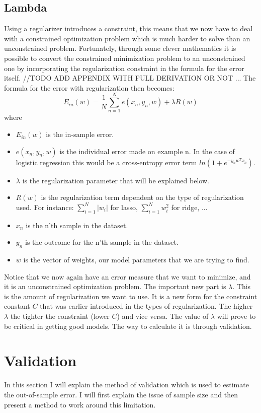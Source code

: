 \subsection{Lambda}
Using a regularizer introduces a constraint, this means that we now have to deal with a constrained optimization problem which is much harder to solve than an unconstrained problem. Fortunately, through some clever mathematics it is possible to convert the constrained minimization problem to an unconstrained one by incorporating the regularization constraint in the formula for the error itself. //TODO ADD APPENDIX WITH FULL DERIVATION OR NOT ... The formula for the error with regularization then becomes:
$$
E_{in}(w) = \frac{1}{N}\sum_{n=1}^{N}e(x_{n},y_{n},w)+\lambda R(w)
$$
where
\begin{itemize}
	\item $E_{in}(w)$ is the in-sample error.
	\item $e(x_{n},y_{n},w)$ is the individual error made on example n. In the case of logistic regression this would be a cross-entropy error term $ln(1+e^{-y_{n}w^{T}x_{n}})$.
	\item $\lambda$ is the regularization parameter that will be explained below.
	\item $R(w)$ is the regularization term dependent on the type of regularization used. For instance: $\sum_{i=1}^{N}\lvert w_{i}\rvert$ for lasso, $\sum_{i=1}^{N}w_{i}^{2}$ for ridge, ...
	\item $x_{n}$ is the n'th sample in the dataset.
	\item $y_{n}$ is the outcome for the n'th sample in the dataset.
	\item $w$ is the vector of weights, our model parameters that we are trying to find.
\end{itemize}
Notice that we now again have an error measure that we want to minimize, and it is an unconstrained optimization problem. The important new part is $\lambda$. This is the amount of regularization we want to use. It is a new form for the constraint constant $C$ that was earlier introduced in the types of regularization. The higher $\lambda$ the tighter the constraint (lower $C$) and vice versa. The value of $\lambda$ will prove to be critical in getting good models. The way to calculate it is through validation.
\section{Validation}
\label{sec:glm-validation}
In this section I will explain the method of validation which is used to estimate the out-of-sample error. I will first explain the issue of sample size and then present a method to work around this limitation.
